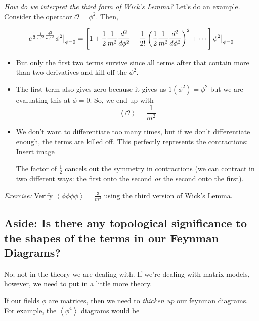 \documentclass{article}
\newcommand{\cO}{\mathcal{O}}
\newcommand{\mean}[1]{\left\langle #1 \right\rangle}
\newcommand{\restr}[2]{{%
  \left.\kern-\nulldelimiterspace %
  #1 %
  \vphantom{\big|} %
  \right|_{#2} %
  }}
\begin{document}
\begin{dottedbox}
  \emph{How do we interpret the third form of Wick's Lemma?} Let's do an example. Consider the operator $\cO = \phi^2$. Then,

  \begin{align*}
    e^{\frac{1}{2}\frac{1}{m^2}\frac{d^2}{d\phi^2}} \restr{\phi^2}{\phi = 0} &= \left[ 1 + \frac{1}{2} \frac{1}{m^2} \frac{d^2}{d\phi^2} +  \frac{1}{2!} \left( \frac{1}{2}\frac{1}{m^2} \frac{d^2}{d\phi^2} \right)^2 + \cdots \right] \restr{\phi^2}{\phi = 0}  \\ 
  \end{align*}
  \begin{itemize}
    \item But only the first two terms survive since all terms after that contain more than two derivatives and kill off the $\phi^2$.
    \item The first term also gives zero because it gives us $1(\phi^2) = \phi^2$ but we are evaluating this at $\phi = 0$. So, we end up with 
    \[ \mean{\cO} = \frac{1}{m^2} \]
    \item We don't want to differentiate too many times, but if we don't differentiate enough, the terms are killed off. This perfectly represents the contractions: Insert image
    
    The factor of $\frac{1}{2}$ cancels out the symmetry in contractions (we can contract in two different ways: the first onto the second \emph{or} the second onto the first).
  \end{itemize}
\end{dottedbox}

\begin{dottedbox}
  \emph{Exercise:} Verify $\mean{\phi \phi \phi \phi} = \frac{3}{m^4}$ using the third version of Wick's Lemma.
\end{dottedbox}

\vskip 1cm
\subsection{Aside: Is there any topological significance to the shapes of the terms in our Feynman Diagrams?}

\vskip 0.5cm
No; not in the theory we are dealing with. If we're dealing with matrix models, however, we need to put in a little more theory. 

\vskip 0.25cm
If our fields $\phi$ are matrices, then we need to \emph{thicken up} our feynman diagrams. For example, the $\mean{\phi^4}$ diagrams would be 
\end{document}
